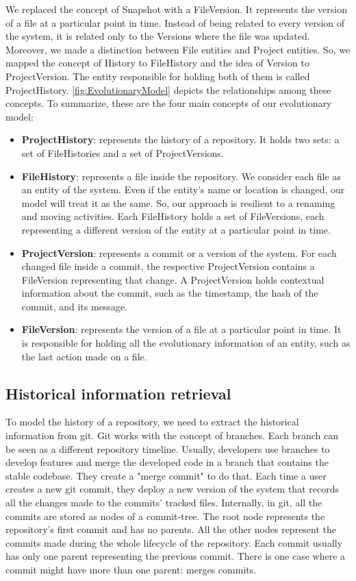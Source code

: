 We replaced the concept of Snapshot with a FileVersion. It represents the version of a file at a particular point in time. Instead of being related to every version of the system, it is related only to the Versions where the file was updated.
Moreover, we made a distinction between File entities and Project entities. So, we mapped the concept of History to FileHistory and the idea of Version to ProjectVersion. 
The entity responsible for holding both of them is called ProjectHistory. \autoref{fig:EvolutionaryModel} depicts the relationships among these concepts. 
To summarize, these are the four main concepts of our evolutionary model: 
\begin{itemize}
    \item \textbf{ProjectHistory}: represents the history of a repository. It holds two sets: a set of FileHistories and a set of ProjectVersions. 
    \item \textbf{FileHistory}: represents a file inside the repository. We consider each file as an entity of the system. Even if the entity's name or location is changed, our model will treat it as the same. So, our approach is resilient to a renaming and moving activities. Each FileHistory holds a set of FileVersions, each representing a different version of the entity at a particular point in time.  
    \item \textbf{ProjectVersion}: represents a commit or a version of the system. 
    For each changed file inside a commit, the respective ProjectVersion contains a FileVersion representing that change.
    A ProjectVersion holds contextual information about the commit, such as the timestamp, the hash of the commit, and its message.
    \item \textbf{FileVersion}: represents the version of a file at a particular point in time.
    It is responsible for holding all the evolutionary information of an entity, such as the last action made on a file. 
\end{itemize}

\subsection{Historical information retrieval}
To model the history of a repository, we need to extract the historical information from git.
Git works with the concept of branches. Each branch can be seen as a different repository timeline.
Usually, developers use branches to develop features and merge the developed code in a branch that contains the stable codebase.
They create a "merge commit" to do that. 
Each time a user creates a new git commit, they deploy a new version of the system that records all the changes made to the commits' tracked files. 
Internally, in git, all the commits are stored as nodes of a commit-tree. 
The root node represents the repository's first commit and has no parents. 
All the other nodes represent the commits made during the whole lifecycle of the repository. 
Each commit usually has only one parent representing the previous commit.
There is one case where a commit might have more than one parent: merges commits.

